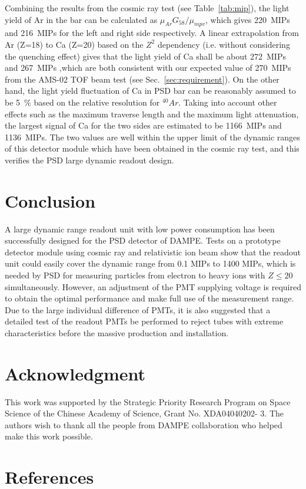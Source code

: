 \documentclass[preprint, times]{elsarticle}
\begin{document}
Combining the results from the cosmic ray test (see Table~\ref{tab:mip}), the light yield of Ar in the bar can be calculated as ${\mu_{Ar}G_{58}} / {\mu_{mpv}}$, which gives \SI{220}{MIPs} and \SI{216}{MIPs} for the left and right side respectively.
A linear extrapolation from Ar (Z=18) to Ca (Z=20) based on the $Z^2$ dependency (i.e. without considering the quenching effect) gives that the light yield of Ca shall be about \SI{272}{MIPs} and \SI{267}{MIPs} ,which are both consistent with our expected value of \SI{270}{MIPs} from the AMS-02 TOF beam test (see Sec.~\ref{sec:requirement}). 
On the other hand, the light yield fluctuation of Ca in PSD bar can be reasonably assumed to be \SI{5}{\percent} based on the relative resolution for $^{40}Ar$.
Taking into account other effects such as the maximum traverse length and the maximum light attenuation, the largest signal of Ca for the two sides are estimated to be \SI{1166}{MIPs} and \SI{1136}{MIPs}.
The two values are well within the upper limit of the dynamic ranges of this detector module which have been obtained in the cosmic ray test, and this verifies the PSD large dynamic readout design.


\section{Conclusion}
\label{sec:conclusion}
A large dynamic range readout unit with low power consumption has been successfully designed for the PSD detector of DAMPE.
Tests on a prototype detector module using cosmic ray and relativistic ion beam show that the readout unit could easily cover the dynamic range from 0.1 MIPs to 1400 MIPs, which is needed by PSD for measuring particles from electron to heavy ions with $Z\leq 20$ simultaneously.
However, an adjustment of the PMT supplying voltage is required to obtain the optimal performance and make full use of the measurement range. 
Due to the large individual difference of PMTs, it is also suggested that a detailed test of the readout PMTs be performed to reject tubes with extreme characteristics before the massive production and installation.

\section*{Acknowledgment}
\label{sec:acknowledgement}

This work was supported by the Strategic Priority Research Program on Space Science of the Chinese Academy of Science,
Grant No. XDA04040202- 3.
The authors wish to thank all the people from DAMPE collaboration who helped make this work possible.

\section*{References}
\label{sec:reference}



\end{document}
